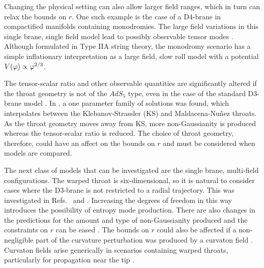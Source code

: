 Changing the physical setting can also allow larger field ranges, which in turn can relax the
bounds on $r$. One such example is the case of a D4-brane in compactified manifolds
containing monodromies. 
The large field variations in this single brane, single field model lead to possibly
observable
tensor modes
\cite{Silverstein:2008sg}. Although formulated in Type IIA string theory, the
monodromy scenario has a simple inflationary interpretation as a large field, slow roll
model with a potential $V(\varphi)\propto\varphi^{2/3}$. 

The tensor-scalar ratio and other observable quantities are
significantly altered if the throat geometry is not of the $AdS_5$ type, even in the case of the
standard D3-brane model \cite{Gmeiner:2007uw}. In
, a one parameter family of solutions was found, which interpolates
between the
Klebanov-Strassler (KS) \cite{ks} and Maldacena-Nu\~{n}ez
\cite{Maldacena:2000yy} throats. As the throat geometry moves away from KS, more
non-Gaussianity is produced whereas the tensor-scalar ratio is reduced.
The choice of throat geometry, therefore, could have an affect on the bounds on $r$
and must be considered when models are compared.



The next class of models that can be investigated are the single brane, multi-field
configurations. 
% 
The warped throat is six-dimensional, so it is natural to consider cases where
the D3-brane is not restricted to a radial trajectory. This was investigated in
Refs.~\cite{spinflation} and \cite{Huang:2007hh}. Increasing the degrees of
freedom in this way introduces the possibility of entropy mode production. There are also
changes in the predictions for the amount and type of non-Gaussianity produced
and the constraints on $r$ can be eased \cite{Arroja:2008yy, Langlois:2009ej,
Langlois:2008qf, Langlois:2008wt, Mizuno:2009mv, Mizuno:2009cv, RenauxPetel:2009sj}.
%
The bounds on $r$ could also be affected if a non-negligible part of the
curvature perturbation was produced by a curvaton field \cite{Lyth:2001nq}.
Curvaton fields arise generically in scenarios containing warped throats,
particularly for propagation near the tip \cite{Li:2008fm, Kobayashi:2009cm}. 
% 
% 

